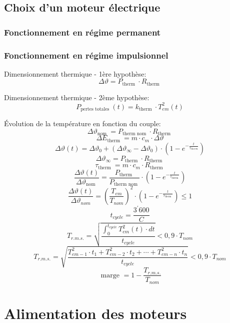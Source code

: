 \documentclass[10pt]{article} %
\begin{document}
\begin{multicols}{3}
\begin{flushleft}
		\subsection*{Choix d'un moteur électrique}
			
			\subsubsection*{Fonctionnement en régime permanent}
			
			\subsubsection*{Fonctionnement en régime impulsionnel}
				
				Dimensionnement thermique - 1ère hypothèse:
				\[\Delta \vartheta=P_{\text {therm }} \cdot R_{\text {therm }}\]
				
				Dimensionnement thermique - 2ème hypothèse:
				\[P_{\text {pertes totales }}(t)=k_{\text {therm }} \cdot T_{e m}^{2}(t)\]
				
				Évolution de la température en fonction du couple:
				\[\Delta \vartheta_{\text {nom }}=P_{\text {therm nom }} \cdot R_{\text {therm }}\]
				\[\Delta E_{\text {therm }}=m \cdot c_{m} \cdot \Delta \vartheta\]
				\[\Delta \vartheta(t)=\Delta \vartheta_{0}+\left(\Delta \vartheta_{\infty}-\Delta \vartheta_{0}\right) \cdot\left(1-e^{-\frac{t}{\tau_{t h e r m}}}\right)\]
				\[\Delta \vartheta_{\infty}=P_{\text {therm }} \cdot R_{\text {therm }}\]
				\[\tau_{\text {therm }}=m \cdot c_{m} \cdot R_{\text {therm }}\]
				\[\frac{\Delta \vartheta(t)}{\Delta \vartheta_{\text {nom }}}=\frac{P_{\text {therm }}}{P_{\text {therm nom }}} \cdot\left(1-e^{-\frac{t}{\tau_{\text {therm }}}}\right)\]
				\[\frac{\Delta \vartheta(t)}{\Delta \vartheta_{n o m}}=\left(\frac{T_{e m}}{T_{n o m}}\right)^{2} \cdot\left(1-e^{-\frac{t}{\tau_{\text {therm }}}}\right) \leq 1\]
				\[t_{c y c l e}=\frac{3^{\prime} 600}{C}\]
				\[T_{r . m . s .}=\sqrt{\frac{\int_{0}^{t_{c y c l e}} T_{e m}^{2}(t) \cdot d t}{t_{c y c l e}}}<0,9 \cdot T_{n o m}\]
				\[T_{r . m . s .}=\sqrt{\frac{T_{e m-1}^{2} \cdot t_{1}+T_{e m-2}^{2} \cdot t_{2}+\cdots+T_{e m-n}^{2} \cdot t_{n}}{t_{c y c l e}}}<0,9 \cdot T_{n o m}\]
				\[\text { marge }=1-\frac{T_{r . m . s .}}{T_{n o m}}\]
				
	\section*{Alimentation des moteurs}
		

\end{flushleft}
\end{multicols}
\end{document}
